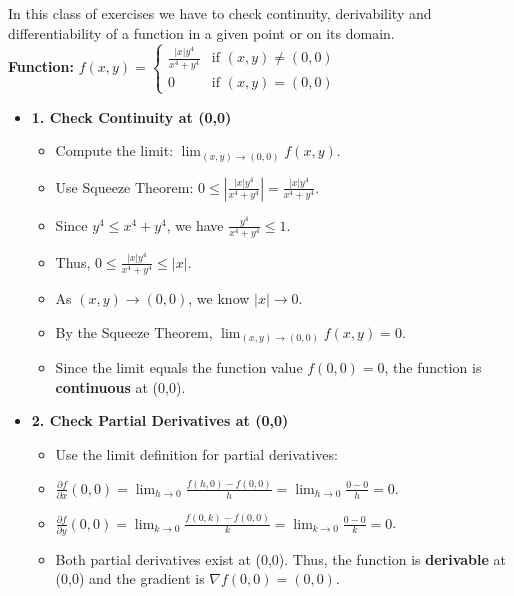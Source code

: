 \begin{cascade}
	In this class of exercises we have to check continuity, derivability and differentiability of a function in a given point or on its domain. \\

	\textbf{Function:} $f(x,y) = \begin{cases} \frac{ |x|y^4}{x^4+y^4} & \text{if } (x,y) \neq (0,0) \\ 0 & \text{if } (x,y) = (0,0) \end{cases}$ \\

	\begin{itemize}
		\item \textbf{1. Check Continuity at (0,0)}
		      \begin{itemize}
			      \item Compute the limit: $\lim_{(x,y)\to(0,0)} f(x,y)$.
			      \item Use Squeeze Theorem: $0 \leq \left| \frac{|x|y^4}{x^4+y^4} \right| = \frac{|x|y^4}{x^4+y^4}$.
			      \item Since $y^4 \leq x^4+y^4$, we have $\frac{y^4}{x^4+y^4} \leq 1$.
			      \item Thus, $0 \leq \frac{|x|y^4}{x^4+y^4} \leq |x|$.
			      \item As $(x,y) \to (0,0)$, we know $|x| \to 0$.
			      \item By the Squeeze Theorem, $\lim_{(x,y)\to(0,0)} f(x,y) = 0$.
			      \item Since the limit equals the function value $f(0,0)=0$, the function is \textbf{continuous} at (0,0).
		      \end{itemize}
		\item \textbf{2. Check Partial Derivatives at (0,0)}
		      \begin{itemize}
			      \item Use the limit definition for partial derivatives:
			      \item $\frac{\partial f}{\partial x}(0,0) = \lim_{h\to 0} \frac{f(h,0) - f(0,0)}{h} = \lim_{h\to 0} \frac{0-0}{h} = 0$.
			      \item $\frac{\partial f}{\partial y}(0,0) = \lim_{k\to 0} \frac{f(0,k) - f(0,0)}{k} = \lim_{k\to 0} \frac{0-0}{k} = 0$.
			      \item Both partial derivatives exist at (0,0). Thus, the function is \textbf{derivable} at (0,0) and the gradient is $\nabla f(0,0) = (0,0)$.
		      \end{itemize}

\end{itemize}
\end{cascade}
